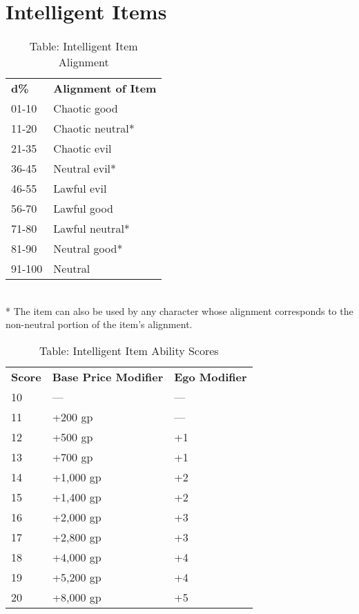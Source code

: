 \section{Intelligent Items}

\label{f0}
\begin{table}[]
\sffamily
\caption{Table: Intelligent Item Alignment}
\begin{tabular}{ll}
\textbf{d\%} & \textbf{Alignment of Item}\\
01-10 & Chaotic good \\
 11-20 & Chaotic neutral* \\
 21-35 & Chaotic evil \\
 36-45 & Neutral evil* \\
 46-55 & Lawful evil \\
 56-70 & Lawful good \\
 71-80 & Lawful neutral* \\
 81-90 & Neutral good* \\
 91-100 & Neutral\\
\end{tabular}\\
* The item can also be used by any character whose alignment corresponds to the non-neutral portion of the item's alignment.\\
\end{table}

\begin{table}[]
\sffamily
\caption{Table: Intelligent Item Ability Scores}
\begin{tabular}{lll}
\textbf{Score} & \textbf{Base Price Modifier} & \textbf{Ego Modifier}\\
10 &  --- &  --- \\
 11 &  +200 gp &  --- \\
 12 &  +500 gp &  +1 \\
 13 &  +700 gp &  +1 \\
 14 &  +1,000 gp &  +2 \\
 15 &  +1,400 gp &  +2 \\
 16 &  +2,000 gp &  +3 \\
 17 &  +2,800 gp &  +3 \\
 18 &  +4,000 gp &  +4 \\
 19 &  +5,200 gp &  +4 \\
 20 &  +8,000 gp &  +5\\
\end{tabular}
\end{table}

